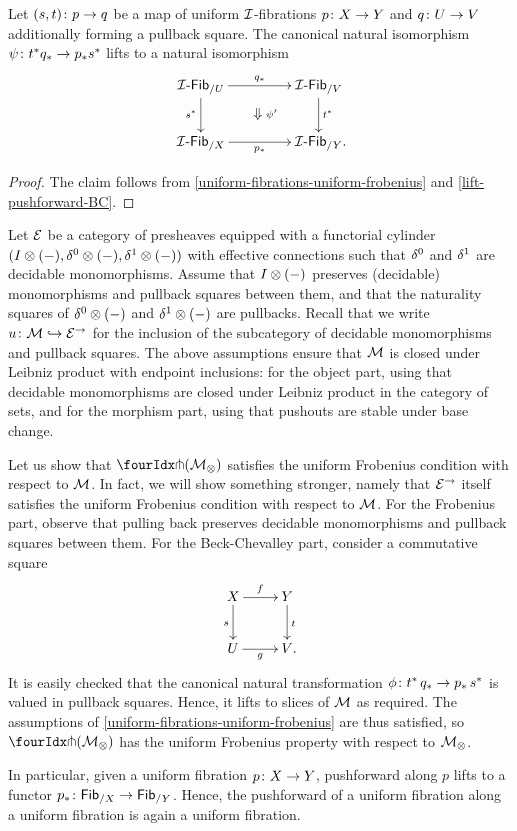 \documentclass[reqno,10pt,a4paper,oneside,draft]{amsart}
\begin{document}
\begin{corollary} \label{uniform-fibrations-BC-pushforward}
Let $(s, t) \co p \to q$ be a map of uniform $\cal{I}$-fibrations $p \co X \to Y$ and $q \co U \to V$ additionally forming a pullback square.
The canonical natural isomorphism $\psi \co t^* q_* \to p_* s^*$ lifts to a natural isomorphism
\[
\xymatrix@C+2em{
  \Fib[\cal{I}]_{/U}
  \ar[r]^{q_*}
  \ar[d]_{s^*}
  \ar@{}[dr]|{\textstyle\Downarrow \rlap{$\labelstyle \psi'$}}
&
  \Fib[\cal{I}]_{/V}
  \ar[d]^{t^*}
\\
  \Fib[\cal{I}]_{/X}
  \ar[r]_{p_*}
&
  \Fib[\cal{I}]_{/Y}
\rlap{.}}
\]
\end{corollary}

\begin{proof}
The claim follows from \cref{uniform-fibrations-uniform-frobenius} and \cref{lift-pushforward-BC}.
\end{proof}

\begin{example} \label{frobenius-uniform-presheaf}
Let $\catE$ be a category of presheaves equipped with a functorial cylinder $(\interval \otimes (-), \lcyl \otimes (-), \rcyl \otimes (-))$ with effective connections such that $\lcyl$ and $\rcyl$ are decidable monomorphisms.
Assume that $\interval \otimes (-)$ preserves (decidable) monomorphisms and pullback squares between them, and that the naturality squares of $\lcyl \otimes (-)$ and $\rcyl \otimes (-)$ are pullbacks.
Recall that we write $u \co \cal{M} \hookrightarrow \catE^\to$ for the inclusion of the subcategory of decidable monomorphisms and pullback squares.
The above assumptions ensure that $\cal{M}$ is closed under Leibniz product with endpoint inclusions: for the object part, using that decidable monomorphisms are closed under Leibniz product in the category of sets, and for the morphism part, using that pushouts are stable under base change.

Let us show that $\liftr{(\cal{M}_\otimes)}$ satisfies the uniform Frobenius condition with respect to $\cal{M}$.
In fact, we will show something stronger, namely that $\catE^\to$ itself satisfies the uniform Frobenius condition with respect to $\cal{M}$.
For the Frobenius part, observe that pulling back preserves decidable monomorphisms and pullback squares between them.
For the Beck-Chevalley part, consider a commutative square
\[
\xymatrix{
  X
  \ar[r]^{f}
  \ar[d]_{s}
&
  Y
  \ar[d]^{t}
\\
  U
  \ar[r]_{g}
&
  V
\rlap{.}}
\]
It is easily checked that the canonical natural transformation $\phi \co t^* \, q_* \to p_* \, s^*$ is valued in pullback squares.
Hence, it lifts to slices of $\cal{M}$ as required.
The assumptions of \cref{uniform-fibrations-uniform-frobenius} are thus satisfied, so $\liftr{(\cal{M}_\otimes)}$ has the uniform Frobenius property with respect to $\cal{M}_\otimes$.

In particular, given a uniform fibration $p \co X \to Y$, pushforward along $p$ lifts to a functor $p_* \co \Fib_{/X} \to \Fib_{/Y}$.
Hence, the pushforward of a uniform fibration along a uniform fibration is again a uniform fibration.
\end{example}
\end{document}
